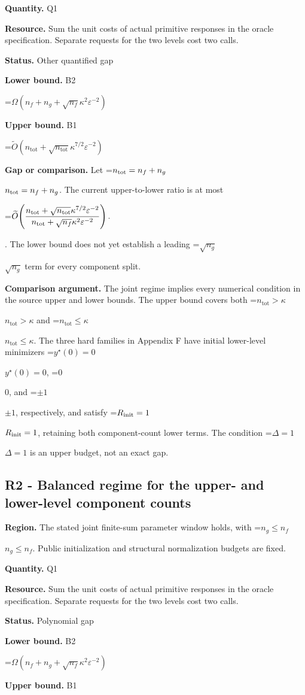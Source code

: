 \documentclass[10pt,a4paper]{article}
\newcommand{\AtlasMath}[1]{\par\begingroup\centering\setbox0=\hbox{$\displaystyle #1$}\ifdim\wd0>1.4\linewidth\typeout{ATLAS WIDE FORMULA: \the\wd0}\fi\ifdim\wd0>\linewidth\resizebox{\linewidth}{!}{\box0}\else\box0\fi\par\endgroup}
\newcommand{\AtlasInlineMath}[1]{\begingroup\setbox0=\hbox{$#1$}\ifdim\wd0>.4\linewidth\endgroup\AtlasMath{#1}\else\endgroup$#1$\fi}
\begin{document}
\textbf{Quantity.} Q1

\textbf{Resource.} Sum the unit costs of actual primitive responses in the oracle specification. Separate requests for the two levels cost two calls.

\textbf{Status.} Other quantified gap

\textbf{Lower bound.} B2

\AtlasMath{\Omega (n_f+n_g+\sqrt{n_f} \kappa ^2 \varepsilon ^{-2})}
\textbf{Upper bound.} B1

\AtlasMath{\widetilde O(n_{\mathrm{tot}}+\sqrt{n_{\mathrm{tot}}} \kappa ^{7/2} \varepsilon ^{-2})}
\textbf{Gap or comparison.} Let \AtlasInlineMath{n_{\rm tot}=n_f+n_g}. The current upper-to-lower ratio is at most 
\AtlasMath{\widetilde{O}\!\left(\frac{n_{\rm tot}+\sqrt{n_{\rm tot}}\kappa^{7/2}\varepsilon^{-2}}{n_{\rm tot}+\sqrt{n_f}\kappa^2\varepsilon^{-2}}\right).}
. The lower bound does not yet establish a leading \AtlasInlineMath{\sqrt{n_g}} term for every component split.

\textbf{Comparison argument.} The joint regime implies every numerical condition in the source upper and lower bounds. The upper bound covers both \AtlasInlineMath{n_{\mathrm{tot}}>\kappa} and \AtlasInlineMath{n_{\mathrm{tot}}\le\kappa}. The three hard families in Appendix F have initial lower-level minimizers \AtlasInlineMath{y^\star(0)=0}, \AtlasInlineMath{0}, and \AtlasInlineMath{\pm1}, respectively, and satisfy \AtlasInlineMath{R_{\rm init}=1}, retaining both component-count lower terms. The condition \AtlasInlineMath{\Delta=1} is an upper budget, not an exact gap.

\subsection{R2 - Balanced regime for the upper- and lower-level component counts}
\textbf{Region.} The stated joint finite-sum parameter window holds, with \AtlasInlineMath{n_g\le n_f}. Public initialization and structural normalization budgets are fixed.

\textbf{Quantity.} Q1

\textbf{Resource.} Sum the unit costs of actual primitive responses in the oracle specification. Separate requests for the two levels cost two calls.

\textbf{Status.} Polynomial gap

\textbf{Lower bound.} B2

\AtlasMath{\Omega (n_f+n_g+\sqrt{n_f} \kappa ^2 \varepsilon ^{-2})}
\textbf{Upper bound.} B1
\end{document}
